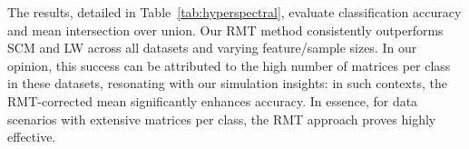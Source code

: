 \documentclass{article}
\theoremstyle{plain}
\theoremstyle{definition}
\theoremstyle{remark}
\begin{document}
The results, detailed in Table~\ref{tab:hyperspectral}, evaluate classification accuracy and mean intersection over union. Our RMT method consistently outperforms SCM and LW across all datasets and varying feature/sample sizes. In our opinion, this success can be attributed to the high number of matrices per class in these datasets, resonating with our simulation insights: in such contexts, the RMT-corrected mean significantly enhances accuracy. In essence, for data scenarios with extensive matrices per class, the RMT approach proves highly effective.


\end{document}
